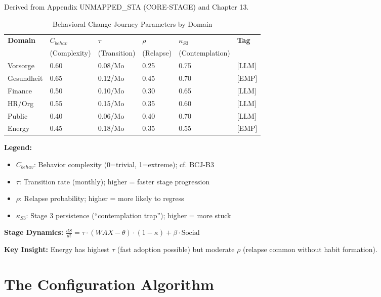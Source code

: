 Derived from Appendix UNMAPPED_STA (CORE-STAGE) and Chapter 13.

\begin{table}[htbp]
\centering
\caption{Behavioral Change Journey Parameters by Domain}
\label{tab:ggg-stage-mapping}
\renewcommand{\arraystretch}{1.3}
\begin{tabular}{@{}llllll@{}}
\toprule
\textbf{Domain} & \textbf{$C_{behav}$} & \textbf{$\tau$} & \textbf{$\rho$} & \textbf{$\kappa_{S3}$} & \textbf{Tag} \\
 & (Complexity) & (Transition) & (Relapse) & (Contemplation) & \\
\midrule
Vorsorge & 0.60 & 0.08/Mo & 0.25 & 0.75 & [LLM] \\
Gesundheit & 0.65 & 0.12/Mo & 0.45 & 0.70 & [EMP] \\
Finance & 0.50 & 0.10/Mo & 0.30 & 0.65 & [LLM] \\
HR/Org & 0.55 & 0.15/Mo & 0.35 & 0.60 & [LLM] \\
Public & 0.40 & 0.06/Mo & 0.40 & 0.70 & [LLM] \\
Energy & 0.45 & 0.18/Mo & 0.35 & 0.55 & [EMP] \\
\bottomrule
\end{tabular}
\end{table}

\textbf{Legend:}
\begin{itemize}[nosep]
\item $C_{behav}$: Behavior complexity (0=trivial, 1=extreme); cf. BCJ-B3
\item $\tau$: Transition rate (monthly); higher = faster stage progression
\item $\rho$: Relapse probability; higher = more likely to regress
\item $\kappa_{S3}$: Stage 3 persistence (``contemplation trap''); higher = more stuck
\end{itemize}

\textbf{Stage Dynamics:} $\frac{dS}{dt} = \tau \cdot (WAX - \theta) \cdot (1-\kappa) + \beta \cdot \text{Social}$

\textbf{Key Insight:} Energy has highest $\tau$ (fast adoption possible) but moderate $\rho$ (relapse common without habit formation).


\section{The Configuration Algorithm}
\label{sec:ggg-algorithm}

